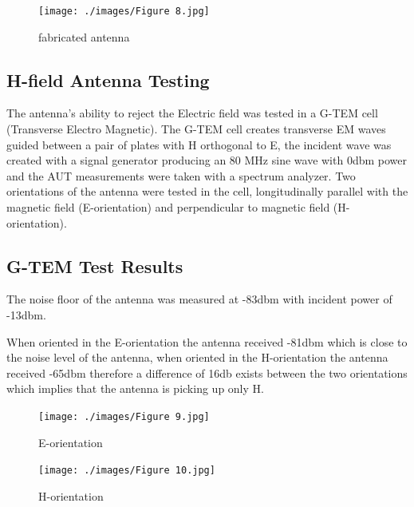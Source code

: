 \begin{figure}[h]
	\begin{center}
		\texttt{[image: ./images/Figure 8.jpg]}
		\caption{fabricated antenna}
		\label{fig:hfield_fig8}
	\end{center}
\end{figure}

\subsection{H-field Antenna Testing}

The antenna’s ability to reject the Electric field was tested in a G-TEM cell (Transverse Electro Magnetic). The G-TEM cell creates transverse EM waves guided between a pair of plates with H orthogonal to E, the incident wave was created with a signal generator producing an 80 MHz sine wave with 0dbm power and the AUT measurements were taken with a spectrum analyzer. Two orientations of the antenna were tested in the cell, longitudinally parallel with the magnetic field (E-orientation) and perpendicular to magnetic field (H-orientation).

\subsection{G-TEM Test Results}

The noise floor of the antenna was measured at -83dbm with incident power of -13dbm.

When oriented in the E-orientation the antenna received -81dbm which is close to the noise level of the antenna, when oriented in the H-orientation the antenna received -65dbm therefore a difference of 16db exists between the two orientations which implies that the antenna is picking up only H.

\begin{figure}[h]
	\begin{center}
		\texttt{[image: ./images/Figure 9.jpg]}
		\caption{E-orientation}
		\label{fig:hfield_fig9}
	\end{center}
\end{figure}

\begin{figure}[h]
	\begin{center}
		\texttt{[image: ./images/Figure 10.jpg]}
		\caption{H-orientation}
		\label{fig:hfield_fig10}
	\end{center}
\end{figure}





